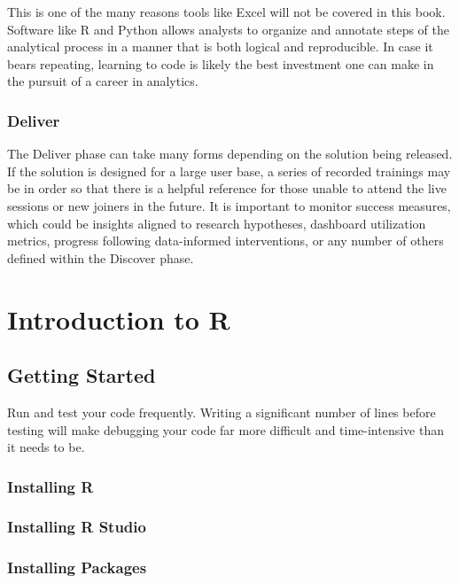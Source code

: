 \documentclass[]{book}
\begin{document}
This is one of the many reasons tools like Excel will not be covered in this book. Software like R and Python allows analysts to organize and annotate steps of the analytical process in a manner that is both logical and reproducible. In case it bears repeating, learning to code is likely the best investment one can make in the pursuit of a career in analytics.

\hypertarget{deliver}{%
\subsection{Deliver}\label{deliver}}

The Deliver phase can take many forms depending on the solution being released. If the solution is designed for a large user base, a series of recorded trainings may be in order so that there is a helpful reference for those unable to attend the live sessions or new joiners in the future. It is important to monitor success measures, which could be insights aligned to research hypotheses, dashboard utilization metrics, progress following data-informed interventions, or any number of others defined within the Discover phase.

\hypertarget{r-intro}{%
\chapter{Introduction to R}\label{r-intro}}

\hypertarget{getting-started}{%
\section{Getting Started}\label{getting-started}}

Run and test your code frequently. Writing a significant number of lines before testing will make debugging your code far more difficult and time-intensive than it needs to be.

\hypertarget{installing-r}{%
\subsection{Installing R}\label{installing-r}}

\hypertarget{installing-r-studio}{%
\subsection{Installing R Studio}\label{installing-r-studio}}

\hypertarget{installing-packages}{%
\subsection{Installing Packages}\label{installing-packages}}
\end{document}
